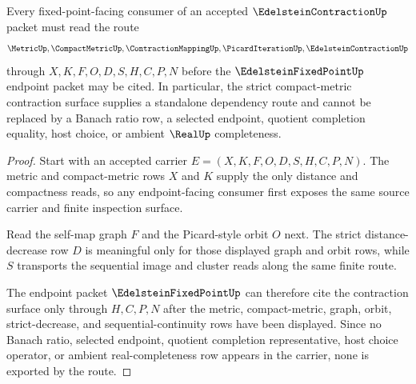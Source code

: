 \begin{theorem}
\label{thm:edelstein-contraction-compactmetric-route}
Every fixed-point-facing consumer of an accepted $\EdelsteinContractionUp$ packet must read the route
$$
\MetricUp,\CompactMetricUp,\ContractionMappingUp,\PicardIterationUp,\EdelsteinContractionUp
$$
through $X,K,F,O,D,S,H,C,P,N$ before the $\EdelsteinFixedPointUp$ endpoint packet may be cited. In particular, the strict compact-metric contraction surface supplies a standalone dependency route and cannot be replaced by a Banach ratio row, a selected endpoint, quotient completion equality, host choice, or ambient $\RealUp$ completeness.
\end{theorem}
\begin{proof}
Start with an accepted carrier $E=(X,K,F,O,D,S,H,C,P,N)$. The metric and compact-metric rows $X$ and $K$ supply the only distance and compactness reads, so any endpoint-facing consumer first exposes the same source carrier and finite inspection surface.

Read the self-map graph $F$ and the Picard-style orbit $O$ next. The strict distance-decrease row $D$ is meaningful only for those displayed graph and orbit rows, while $S$ transports the sequential image and cluster reads along the same finite route.

The endpoint packet $\EdelsteinFixedPointUp$ can therefore cite the contraction surface only through $H,C,P,N$ after the metric, compact-metric, graph, orbit, strict-decrease, and sequential-continuity rows have been displayed. Since no Banach ratio, selected endpoint, quotient completion representative, host choice operator, or ambient real-completeness row appears in the carrier, none is exported by the route.
\end{proof}



